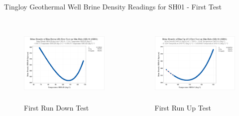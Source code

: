 \begin{frame}{Tingloy Geothermal Well Brine Density Readings for SH01 - First Test\cite{halcon2015detailed}}
    \begin{columns}
    \begin{figure}
        \centering
        \caption{\centering First Run Down Test}
        \includegraphics[height=4cm]{images/sh01r1d.png}
    \end{figure}
    \begin{figure}
        \centering
        \caption{\centering First Run Up Test}
        \includegraphics[height=4cm]{images/sh01r1u.png}
    \end{figure}
    \end{columns}
\end{frame}

